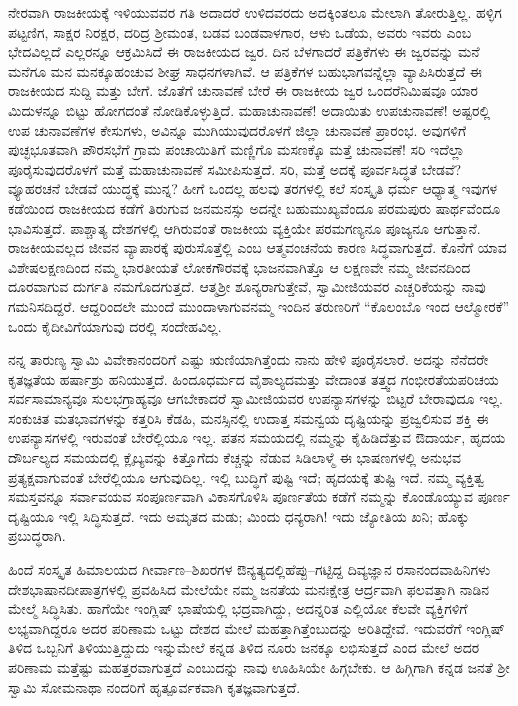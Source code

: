 ನೇರವಾಗಿ ರಾಜಕೀಯಕ್ಕೆ ಇಳಿಯುವವರ ಗತಿ ಅದಾದರೆ ಉಳಿದವರದು ಅದಕ್ಕಿಂತಲೂ ಮೇಲಾಗಿ ತೋರುತ್ತಿಲ್ಲ. ಹಳ್ಳಿಗ ಪಟ್ಟಣಿಗ, ಸಾಕ್ಷರ ನಿರಕ್ಷರ, ದರಿದ್ರ ಶ‍್ರೀಮಂತ, ಬಡವ ಬಂಡವಾಳಗಾರ, ಆಳು ಒಡೆಯ, ಅವರು ಇವರು ಎಂಬ ಭೇದವಿಲ್ಲದೆ ಎಲ್ಲರನ್ನೂ ಆಕ್ರಮಿಸಿದೆ ಈ ರಾಜಕೀಯದ ಜ್ವರ. ದಿನ ಬೆಳಗಾದರೆ ಪತ್ರಿಕೆಗಳು ಈ ಜ್ವರವನ್ನು ಮನೆ ಮನೆಗೂ ಮನ ಮನಕ್ಕೂಹಂಚುವ ಶೀಘ್ರ ಸಾಧನಗಳಾಗಿವೆ. ಆ ಪತ್ರಿಕೆಗಳ ಬಹುಭಾಗವನ್ನೆಲ್ಲಾ ವ್ಯಾಪಿಸಿರುತ್ತದೆ ಈ ರಾಜಕೀಯದ ಸುದ್ದಿ ಮತ್ತು ಬೇಗೆ. ಜೊತೆಗೆ ಚುನಾವಣೆ ಬೇರೆ ಈ ರಾಜಕೀಯ ಜ್ವರ ಒಂದರೆನಿಮಿಷವೂ ಯಾರ ಮಿದುಳನ್ನೂ ಬಿಟ್ಟು ಹೋಗದಂತೆ ನೋಡಿಕೊಳ್ಳುತ್ತಿದೆ. ಮಹಾಚುನಾವಣೆ! ಅದಾಯಿತು ಉಪಚುನಾವಣೆ! ಅಷ್ಟರಲ್ಲಿ ಉಪ ಚುನಾವಣೆಗಳ ಕೇಸುಗಳು, ಅವಿನ್ನೂ ಮುಗಿಯುವುದರೊಳಗೆ ಜಿಲ್ಲಾ ಚುನಾವಣೆ ಪ್ರಾರಂಭ. ಅವುಗಳಿಗೆ ಪುಚ್ಛಭೂತವಾಗಿ ಪೌರಸಭೆಗೆ ಗ್ರಾಮ ಪಂಚಾಯಿತಿಗೆ ಮಣ್ಣಿಗೊ ಮಸಣಕ್ಕೊ ಮತ್ತೆ ಚುನಾವಣೆ! ಸರಿ ಇದೆಲ್ಲಾ ಪೂರೈಸುವುದರೊಳಗೆ ಮತ್ತೆ ಮಹಾಚುನಾವಣೆ ಸಮೀಪಿಸುತ್ತದೆ. ಸರಿ, ಮತ್ತೆ ಅದಕ್ಕೆ ಪೂರ್ವಸಿದ್ಧತೆ ಬೇಡವೆ? ವ್ಯೂಹರಚನೆ ಬೇಡವೆ ಯುದ್ಧಕ್ಕೆ ಮುನ್ನ? ಹೀಗೆ ಒಂದಲ್ಲ ಹಲವು ತರಗಳಲ್ಲಿ ಕಲೆ ಸಂಸ್ಕೃತಿ ಧರ್ಮ ಆಧ್ಯಾತ್ಮ ಇವುಗಳ ಕಡೆಯಿಂದ ರಾಜಕೀಯದ ಕಡೆಗೆ ತಿರುಗುವ ಜನಮನಸ್ಸು ಅದನ್ನೇ ಬಹುಮುಖ್ಯವೆಂದೂ ಪರಮಪುರು ಷಾರ್ಥವೆಂದೂ ಭಾವಿಸುತ್ತದೆ. ಪಾಶ್ಚಾತ್ಯ ದೇಶಗಳಲ್ಲಿ ಆಗಿರುವಂತೆ ರಾಜಕೀಯ ವ್ಯಕ್ತಿಯೇ ಪರಮಗಣ್ಯನೂ ಪೂಜ್ಯನೂ ಆಗುತ್ತಾನೆ. ರಾಜಕೀಯವಲ್ಲದ ಜೀವನ ವ್ಯಾಪಾರಕ್ಕೆ ಪುರುಸೊತ್ತೆಲ್ಲಿ ಎಂಬ ಆತ್ಮವಂಚನೆಯ ಕಾರಣ ಸಿದ್ಧವಾಗುತ್ತದೆ. ಕೊನೆಗೆ ಯಾವ ವಿಶೇಷಲಕ್ಷಣದಿಂದ ನಮ್ಮ ಭಾರತೀಯತೆ ಲೋಕಗೌರವಕ್ಕೆ ಭಾಜನವಾಗಿತ್ತೊ ಆ ಲಕ್ಷಣವೇ ನಮ್ಮ ಜೀವನದಿಂದ ದೂರವಾಗುವ ದುರ್ಗತಿ ನಮಗೊದಗುತ್ತದೆ. ಆತ್ಮಶ‍್ರೀ ಶೂನ್ಯರಾಗುತ್ತೇವೆ, ಸ್ವಾಮೀಜಿಯವರ ಎಚ್ಚರಿಕೆಯನ್ನು ನಾವು ಗಮನಿಸದಿದ್ದರೆ. ಆದ್ದರಿಂದಲೇ ಮುಂದೆ ಮುಂದಾಳಾಗುವನಮ್ಮ ಇಂದಿನ ತರುಣರಿಗೆ “ಕೊಲಂಬೊ ಇಂದ ಆಲ್ಮೋರಕೆ” ಒಂದು ಕೈದೀವಿಗೆಯಾಗುವು ದರಲ್ಲಿ ಸಂದೇಹವಿಲ್ಲ.

ನನ್ನ ತಾರುಣ್ಯ ಸ್ವಾಮಿ ವಿವೇಕಾನಂದರಿಗೆ ಎಷ್ಟು ಋಣಿಯಾಗಿತ್ತೆಂದು ನಾನು ಹೇಳಿ ಪೂರೈಸಲಾರೆ. ಅದನ್ನು ನೆನೆದರೇ ಕೃತಜ್ಞತೆಯ ಹರ್ಷಾಶ್ರು ಹನಿಯುತ್ತದೆ. ಹಿಂದೂಧರ್ಮದ ವೈಶಾಲ್ಯದಮತ್ತು ವೇದಾಂತ ತತ್ತ್ವದ ಗಂಭೀರತೆಯಪರಿಚಯ ಸರ್ವಸಾಮಾನ್ಯವೂ ಸುಲಭಗ್ರಾಹ್ಯವೂ ಆಗಬೇಕಾದರೆ ಸ್ವಾಮೀಜಿಯವರ ಉಪನ್ಯಾಸಗಳನ್ನು ಬಿಟ್ಟರೆ ಬೇರಾವುದೂ ಇಲ್ಲ. ಸಂಕುಚಿತ ಮತಭಾವಗಳನ್ನು ಕತ್ತರಿಸಿ ಕೆಡಹಿ, ಮನಸ್ಸಿನಲ್ಲಿ ಉದಾತ್ತ ಸಮನ್ವಯ ದೃಷ್ಟಿಯನ್ನು ಪ್ರಜ್ವಲಿಸುವ ಶಕ್ತಿ ಈ ಉಪನ್ಯಾಸಗಳಲ್ಲಿ ಇರುವಂತೆ ಬೇರೆಲ್ಲಿಯೂ ಇಲ್ಲ. ಪತನ ಸಮಯದಲ್ಲಿ ನಮ್ಮನ್ನು ಕೈಹಿಡಿದೆತ್ತುವ ಔದಾರ್ಯ, ಹೃದಯ ದೌರ್ಬಲ್ಯದ ಸಮಯದಲ್ಲಿ ಕ್ಲೈಬ್ಯವನ್ನು ಕಿತ್ತೊಗೆದು ಕೆಚ್ಚನ್ನು ನೆಡುವ ಸಿಡಿಲಾಳ್ಮೆ ಈ ಭಾಷಣಗಳಲ್ಲಿ ಅನುಭವ ಪ್ರತ್ಯಕ್ಷವಾಗುವಂತೆ ಬೇರೆಲ್ಲಿಯೂ ಆಗುವುದಿಲ್ಲ. ಇಲ್ಲಿ ಬುದ್ಧಿಗೆ ಪುಷ್ಟಿ ಇದೆ; ಹೃದಯಕ್ಕೆ ತುಷ್ಟಿ ಇದೆ. ನಮ್ಮ ವ್ಯಕ್ತಿತ್ವ ಸಮಸ್ತವನ್ನೂ ಸರ್ವಾವಯವ ಸಂಪೂರ್ಣವಾಗಿ ವಿಕಾಸಗೊಳಿಸಿ ಪೂರ್ಣತೆಯ ಕಡೆಗೆ ನಮ್ಮನ್ನು ಕೊಂಡೊಯ್ಯುವ ಪೂರ್ಣ ದೃಷ್ಟಿಯೂ ಇಲ್ಲಿ ಸಿದ್ಧಿಸುತ್ತದೆ. ಇದು ಅಮೃತದ ಮಡು; ಮಿಂದು ಧನ್ಯರಾಗಿ! ಇದು ಜ್ಯೋತಿಯ ಖನಿ; ಹೊಕ್ಕು ಪ್ರಬುದ್ಧರಾಗಿ.

ಹಿಂದೆ ಸಂಸ್ಕೃತ ಹಿಮಾಲಯದ ಗೀರ್ವಾಣ–ಶಿಖರಗಳ ಔನ್ಯತ್ಯದಲ್ಲಿಹೆಪ್ಪು–ಗಟ್ಟಿದ್ದ ದಿವ್ಯಜ್ಞಾನ ರಸಾನಂದವಾಹಿನಿಗಳು ದೇಶಭಾಷಾನದೀಪಾತ್ರಗಳಲ್ಲಿ ಪ್ರವಹಿಸಿದ ಮೇಲೆಯೇ ನಮ್ಮ ಜನತೆಯ ಮನಃಕ್ಷೇತ್ರ ಆರ್ದ್ರವಾಗಿ ಫಲವತ್ತಾಗಿ ನಾಡಿನ ಮೇಲ್ಮೆ ಸಿದ್ಧಿಸಿತು. ಹಾಗೆಯೇ ಇಂಗ್ಲಿಷ್​ ಭಾಷೆಯಲ್ಲಿ ಭದ್ರವಾಗಿದ್ದು, ಅದನ್ನರಿತ ಎಲ್ಲಿಯೋ ಕೆಲವೇ ವ್ಯಕ್ತಿಗಳಿಗೆ ಲಭ್ಯವಾಗಿದ್ದರೂ ಅದರ ಪರಿಣಾಮ ಒಟ್ಟು ದೇಶದ ಮೇಲೆ ಮಹತ್ತಾಗಿತ್ತೆಂಬುದನ್ನು ಅರಿತಿದ್ದೇವೆ. ಇದುವರೆಗೆ ಇಂಗ್ಲಿಷ್​ ತಿಳಿದ ಒಬ್ಬನಿಗೆ ತಿಳಿಯುತ್ತಿದ್ದುದು ಇನ್ನುಮೇಲೆ ಕನ್ನಡ ತಿಳಿದ ನೂರು ಜನಕ್ಕೂ ಲಭಿಸುತ್ತದೆ ಎಂದ ಮೇಲೆ ಅದರ ಪರಿಣಾಮ ಮತ್ತೆಷ್ಟು ಮಹತ್ತರವಾಗುತ್ತದೆ ಎಂಬುದನ್ನು ನಾವು ಊಹಿಸಿಯೇ ಹಿಗ್ಗಬೇಕು. ಆ ಹಿಗ್ಗಿಗಾಗಿ ಕನ್ನಡ ಜನತೆ ಶ‍್ರೀ ಸ್ವಾಮಿ ಸೋಮನಾಥಾ ನಂದರಿಗೆ ಹೃತ್ಪೂರ್ವಕವಾಗಿ ಕೃತಜ್ಞವಾಗುತ್ತದೆ.

